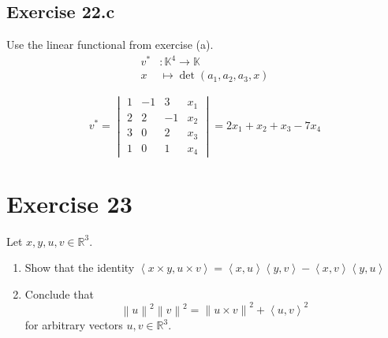 \documentclass[a4paper]{article}
\theoremstyle{definition}
\newcommand\fun[1]{\left\langle{#1}\right\rangle}
\newcommand\norm[1]{\left\|{#1}\right\|}
\begin{document}
\subsection{Exercise 22.c}
Use the linear functional from exercise (a).
\begin{align*}
  v^* &: \mathbb K^4 \to \mathbb K \\
    x &\mapsto \det(a_1, a_2, a_3, x)
\end{align*}

\[
  v^* =
  \begin{vmatrix}
    1 & -1 & 3 & x_1 \\
    2 & 2 & -1 & x_2 \\
    3 & 0 & 2 & x_3 \\
    1 & 0 & 1 & x_4
  \end{vmatrix}
  = 2x_1 + x_2 + x_3 - 7x_4
\]

\section{Exercise 23}
\begin{ex}
  Let $x,y,u,v \in \mathbb R^3$.
  \begin{enumerate}
    \item Show that the identity $\fun{x \times y, u \times v} = \fun{x,u} \fun{y,v} - \fun{x,v} \fun{y,u}$
    \item Conclude that
      \[ \norm{u}^2 \norm{v}^2 = \norm{u \times v}^2 + \fun{u,v}^2 \]
      for arbitrary vectors $u,v \in \mathbb R^3$.
  \end{enumerate}
\end{ex}
\end{document}
